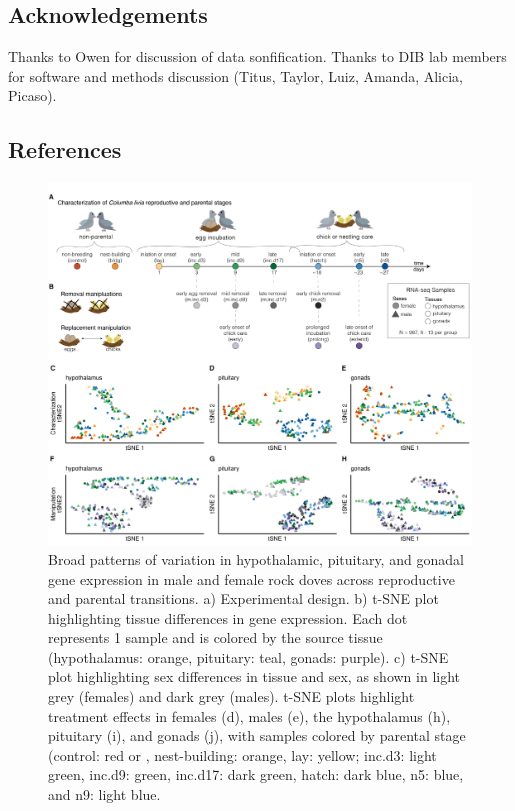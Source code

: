 \hypertarget{acknowledgements}{%
\subsection{Acknowledgements}\label{acknowledgements}}

Thanks to Owen for discussion of data sonfification. Thanks to DIB lab
members for software and methods discussion (Titus, Taylor, Luiz,
Amanda, Alicia, Picaso).

\hypertarget{references}{%
\subsection{References}\label{references}}



\newpage

\begin{figure}[h]
  \centering
  \includegraphics[width=1.0\textwidth]{../../figures/fig1-1}
  \caption{Broad patterns of variation in hypothalamic, pituitary, and gonadal gene expression in male and female rock doves across reproductive and parental transitions. a) Experimental design. b) t-SNE plot highlighting tissue differences in gene expression. Each dot represents 1 sample and is colored by the source tissue (hypothalamus: orange, pituitary: teal, gonads: purple). c) t-SNE plot highlighting sex differences in tissue and sex, as shown in light grey (females) and dark grey (males). t-SNE plots highlight treatment effects in females (d), males (e), the hypothalamus (h), pituitary (i), and gonads (j), with samples colored by parental stage (control: red or , nest-building: orange, lay: yellow; inc.d3: light green, inc.d9: green, inc.d17: dark green, hatch: dark blue, n5: blue, and n9: light blue.}
  \label{figure:fig1}
\end{figure}

